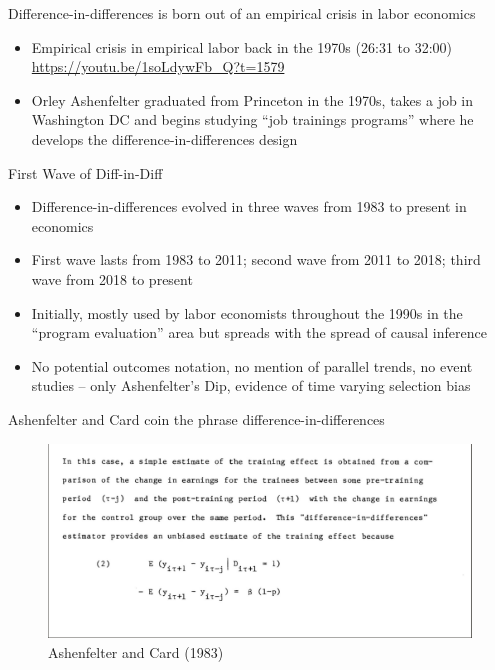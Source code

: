 \documentclass{beamer}
\begin{document}
\begin{frame}{Difference-in-differences is born out of an empirical crisis in labor economics}

\begin{itemize}
\item Empirical crisis in empirical labor back in the 1970s (26:31 to 32:00)  \\ \url{https://youtu.be/1soLdywFb_Q?t=1579}
\item Orley Ashenfelter graduated from Princeton in the 1970s, takes a job in Washington DC and begins studying ``job trainings programs'' where he develops the difference-in-differences design

\end{itemize}


\end{frame}



\begin{frame}{First Wave of Diff-in-Diff}

\begin{itemize}
\item Difference-in-differences evolved in three waves from 1983 to present in economics
\item First wave lasts from 1983 to 2011; second wave from 2011 to 2018; third wave from 2018 to present
\item Initially, mostly used by labor economists throughout the 1990s in the ``program evaluation'' area but spreads with the spread of causal inference 
\item No potential outcomes notation, no mention of parallel trends, no event studies -- only Ashenfelter's Dip, evidence of time varying selection bias

\end{itemize}

\end{frame}


\begin{frame}{Ashenfelter and Card coin the phrase difference-in-differences}

	\begin{figure}
	\caption{Ashenfelter and Card (1983)}
	\includegraphics[scale=0.2]{./lecture_includes/orley1983.png}
	\end{figure}


\end{frame}
\end{document}
